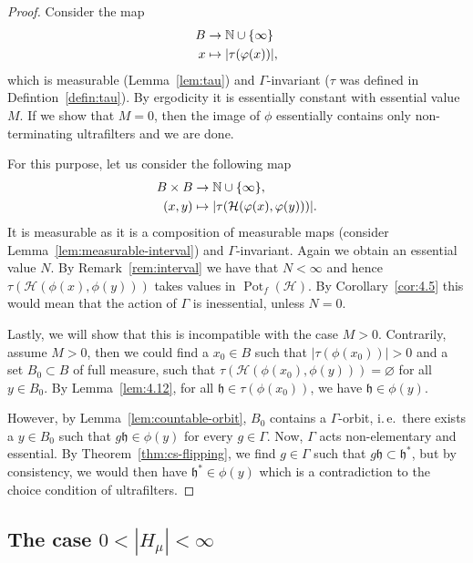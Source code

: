 \begin{proof}
  Consider the map
  \begin{align*}
    B & \to \mathbb{N} \cup \{\infty\}\\
    x & \mapsto |\tau(\varphi(x))|,
  \end{align*}
  which is measurable (Lemma~\ref{lem:tau}) and \(\Gamma\)-invariant (\(\tau\) was defined in Defintion~\ref{defin:tau}). By ergodicity it is essentially constant with essential value \(M\). If we show that \(M = 0\), then the image of \(\phi\) essentially contains only non-terminating ultrafilters and we are done.

  For this purpose, let us consider the following map
  \begin{align*}
    B \times B & \to \mathbb{N} \cup \{\infty\},\\
    (x,y) & \mapsto |\tau(\mathcal{H}(\varphi(x), \varphi(y)))|.
  \end{align*}
  It is measurable as it is a composition of measurable maps (consider Lemma~\ref{lem:measurable-interval}) and \(\Gamma\)-invariant. Again we obtain an essential value \(N\). By Remark~\ref{rem:interval} we have that \(N < \infty\) and hence \(\tau(\mathcal{H}(\phi(x), \phi(y)))\) takes values in \(\operatorname{Pot}_f(\mathcal{H})\). By Corollary~\ref{cor:4.5} this would mean that the action of \(\Gamma\) is inessential, unless \(N = 0\).

  Lastly, we will show that this is incompatible with the case \(M > 0\). Contrarily, assume \(M > 0\), then we could find a \(x_0 \in B\) such that \(|\tau(\phi(x_0))| > 0\) and a set \(B_0 \subset B\) of full measure, such that \(\tau(\mathcal{H}(\phi(x_0), \phi(y))) = \varnothing\) for all \(y \in B_0\). By Lemma~\ref{lem:4.12}, for all \(\mathfrak{h} \in \tau(\phi(x_0))\), we have \(\mathfrak{h} \in \phi(y)\).

  However, by Lemma~\ref{lem:countable-orbit}, \(B_0\) contains a \(\Gamma\)-orbit, i.\,e.\ there exists a \(y \in B_0\) such that \(g\mathfrak{h} \in \phi(y)\) for every \(g \in \Gamma\). Now, \(\Gamma\) acts non-elementary and essential. By Theorem~\ref{thm:cs-flipping}, we find \(g \in \Gamma\) such that \(g\mathfrak{h} \subset \mathfrak{h}^\ast\), but by consistency, we would then have \(\mathfrak{h}^\ast \in \phi(y)\) which is a contradiction to the choice condition of ultrafilters.
\end{proof}

\subsection{The case \(0 < |H_\mu| < \infty\)}
\label{sec:N=finite}

